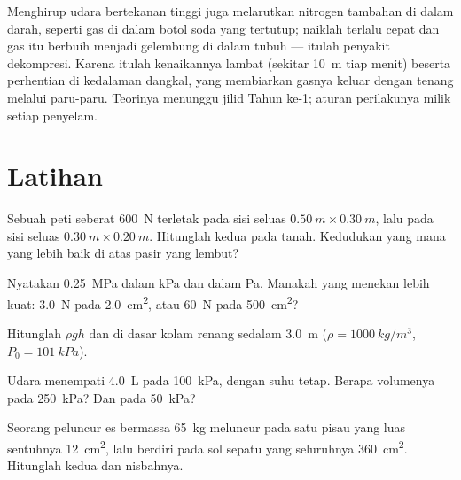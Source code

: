 \begin{remark}[Dekompresi]\label{rem:g10:pressure:deco}
Menghirup udara bertekanan tinggi juga melarutkan nitrogen tambahan di
dalam darah, seperti gas di dalam botol soda yang tertutup; naiklah
terlalu cepat dan gas itu berbuih menjadi gelembung di dalam tubuh ---
itulah penyakit dekompresi. Karena itulah kenaikannya lambat (sekitar
\qty{10}{m} tiap menit) beserta perhentian di kedalaman dangkal, yang
membiarkan gasnya keluar dengan tenang melalui paru-paru. Teorinya
menunggu jilid Tahun ke-1; aturan perilakunya milik setiap penyelam.
\end{remark}

\section{Latihan}

\begin{exercise}[$\star$]\label{exo:g10:pressure:1}
Sebuah peti seberat \qty{600}{N} terletak pada sisi seluas
$\qty{0.50}{m} \times \qty{0.30}{m}$, lalu pada sisi seluas
$\qty{0.30}{m} \times \qty{0.20}{m}$. Hitunglah kedua  pada
tanah. Kedudukan yang mana yang lebih baik di atas pasir yang lembut?
\end{exercise}

\begin{exercise}[$\star$]\label{exo:g10:pressure:2}
Nyatakan \qty{0.25}{MPa} dalam \unit{kPa} dan dalam \unit{Pa}. Manakah
yang menekan lebih kuat: \qty{3.0}{N} pada \qty{2.0}{cm^2}, atau
\qty{60}{N} pada \qty{500}{cm^2}?
\end{exercise}

\begin{exercise}[$\star$]\label{exo:g10:pressure:3}
Hitunglah  $\rho g h$ dan  di dasar kolam
renang sedalam \qty{3.0}{m} ($\rho = \qty{1000}{kg/m^3}$,
$P_0 = \qty{101}{kPa}$).
\end{exercise}

\begin{exercise}[$\star$]\label{exo:g10:pressure:4}
Udara menempati \qty{4.0}{L} pada \qty{100}{kPa}, dengan suhu tetap.
Berapa volumenya pada \qty{250}{kPa}? Dan pada \qty{50}{kPa}?
\end{exercise}

\begin{exercise}[$\star$]\label{exo:g10:pressure:5}
Seorang peluncur es bermassa \qty{65}{kg} meluncur pada satu pisau yang
luas sentuhnya \qty{12}{cm^2}, lalu berdiri pada sol sepatu yang
seluruhnya \qty{360}{cm^2}. Hitunglah kedua  dan nisbahnya.
\end{exercise}

